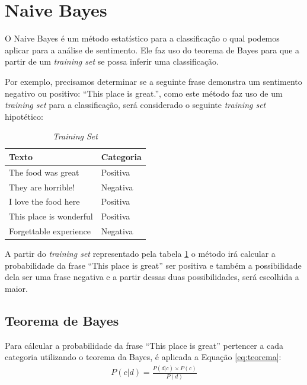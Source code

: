 
\section{Naive Bayes}

O Naive Bayes é um método estatístico para a classificação o qual podemos
aplicar para a análise de sentimento. Ele faz uso do teorema de Bayes para
que a partir de um \textit{training set} se possa inferir uma classificação.

Por exemplo, precisamos determinar se a seguinte frase demonstra um sentimento
negativo ou positivo: ``This place is great.'', como este método faz uso de um
\textit{training set} para a classificação, será considerado o seguinte \textit{training set} hipotético:

\begin{table}[htb]
\centering
\begin{tabular}{|l|l|}
\hline
Texto  & Categoria \\ \hline
The food was great  & Positiva     \\ \hline
They are horrible!    & Negativa     \\ \hline
I love the food here  & Positiva     \\ \hline
This place is wonderful  & Positiva     \\ \hline
Forgettable experience  & Negativa     \\ \hline
\end{tabular}
\caption{\textit{Training Set}}
\label{tab:trainingsetnb}
\end{table}

A partir do \textit{training set} representado pela tabela
\ref{tab:trainingsetnb} o método irá calcular a probabilidade da frase ``This
place is great'' ser positiva e também a possibilidade dela ser uma frase
negativa e a partir dessas duas possibilidades, será escolhida a maior.


\subsection{Teorema de Bayes}

Para cálcular a probabilidade da frase ``This place is great'' pertencer a cada categoria
utilizando o teorema da Bayes, é aplicada a Equação \ref{eq:teorema}:
\begin{equation}
\begin{gathered}
P(c|d) = \frac{P(d|c) \times P(c)}{P(d)} \\
\label{eq:teorema}
\end{gathered}
\end{equation}

